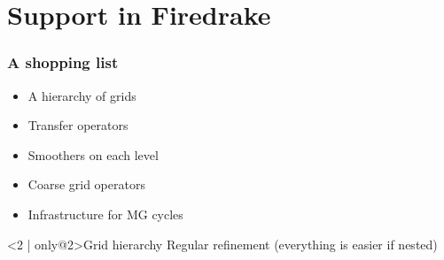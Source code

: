 \documentclass[presentation]{beamer}
\begin{document}
\section{Support in Firedrake}

\begin{frame}[fragile,t]
  \frametitle{A shopping list}
  \begin{itemize}
  \item<1-|alert@2> A hierarchy of grids
  \item<1-|alert@3> Transfer operators
  \item<1-|alert@5> Smoothers on each level
  \item<1-|alert@4> Coarse grid operators
  \item<1-|alert@5> Infrastructure for MG cycles
  \end{itemize}
  \begin{block}<2 | only@2>{Grid hierarchy}
    Regular refinement (everything is easier if nested)

    \begin{center}
\end{center}
\end{block}
\end{frame}
\end{document}
